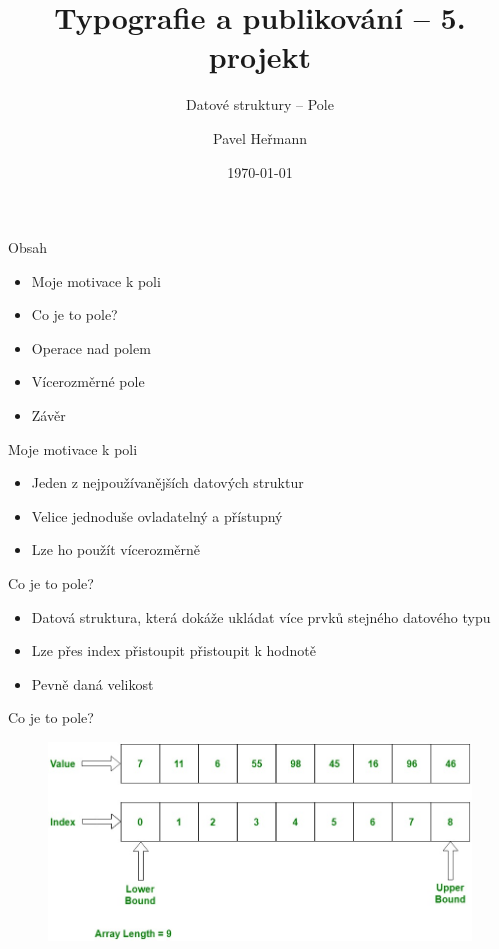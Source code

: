 \documentclass[10pt, hyperref={unicode}]{beamer}
\title{Typografie a publikování -- 5. projekt}
\subtitle{Datové struktury -- Pole}
\author{Pavel Heřmann}
\date{\today}
\institute
{
	Vysoké učení technické v Brně\\
	Fakulta informačních technologií
}
\begin{document}
\maketitle

\begin{frame}{Obsah}
\begin{itemize}
    \item Moje motivace k poli
    \item Co je to pole?
    \item Operace nad polem
    \item Vícerozměrné pole
    \item Závěr
\end{itemize}
\end{frame}

\begin{frame}{Moje motivace k poli}
\begin{itemize}
    \item Jeden z nejpoužívanějších datových struktur
    \item Velice jednoduše ovladatelný a přístupný
    \item Lze ho použít vícerozměrně
\end{itemize}
\end{frame}

\begin{frame}{Co je to pole?}
\begin{itemize}
    \item Datová struktura, která dokáže ukládat více prvků stejného datového typu
    \item Lze přes index přistoupit přistoupit k hodnotě
    \item Pevně daná velikost
\end{itemize}
\end{frame}

\begin{frame}{Co je to pole?}
    \begin{figure}
        \centering
        \includegraphics[scale=0.35]{C-Arrays.jpg}
    \end{figure}
\end{frame}
\end{document}
